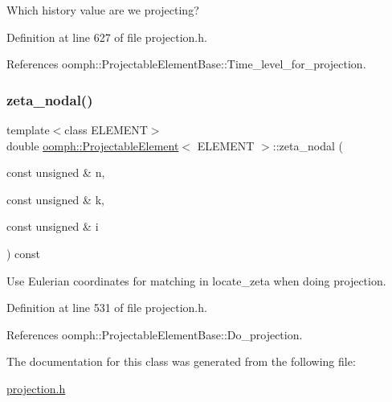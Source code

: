 Which history value are we projecting? 



Definition at line 627 of file projection.\+h.



References oomph\+::\+Projectable\+Element\+Base\+::\+Time\+\_\+level\+\_\+for\+\_\+projection.

\mbox{\label{classoomph_1_1ProjectableElement_aefceb50221fe76ac929d618495530adf}} 
\subsubsection{\texorpdfstring{zeta\+\_\+nodal()}{zeta\_nodal()}}
{\footnotesize\ttfamily template$<$class E\+L\+E\+M\+E\+NT$>$ \\
double \hyperlink{classoomph_1_1ProjectableElement}{oomph\+::\+Projectable\+Element}$<$ E\+L\+E\+M\+E\+NT $>$\+::zeta\+\_\+nodal (\begin{DoxyParamCaption}\item[{const unsigned \&}]{n,  }\item[{const unsigned \&}]{k,  }\item[{const unsigned \&}]{i }\end{DoxyParamCaption}) const\hspace{0.3cm}{\ttfamily [inline]}}



Use Eulerian coordinates for matching in locate\+\_\+zeta when doing projection. 



Definition at line 531 of file projection.\+h.



References oomph\+::\+Projectable\+Element\+Base\+::\+Do\+\_\+projection.



The documentation for this class was generated from the following file\+:\begin{DoxyCompactItemize}
\item 
\hyperlink{projection_8h}{projection.\+h}\end{DoxyCompactItemize}
